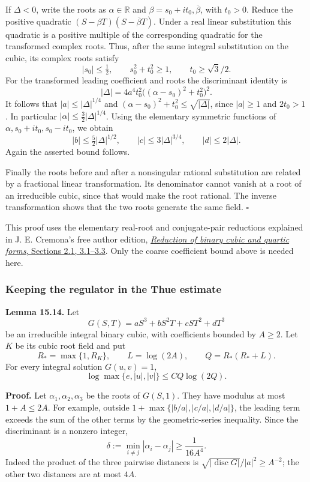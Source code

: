 \documentclass[
  11pt,
  a4paper,
]{article}
\begin{document}
If \(\Delta<0\), write the roots as \(\alpha\in\mathbb R\) and
\(\beta=s_0+it_0,\overline\beta\), with \(t_0>0\). Reduce the positive
quadratic \((S-\beta T)(S-\overline\beta T)\). Under a real linear
substitution this quadratic is a positive multiple of the corresponding
quadratic for the transformed complex roots. Thus, after the same
integral substitution on the cubic, its complex roots satisfy \[
|s_0|\le\tfrac12,\qquad s_0^2+t_0^2\ge1,
\qquad t_0\ge\sqrt3/2.
\] For the transformed leading coefficient and roots the discriminant
identity is \[
|\Delta|=4a^4t_0^2
              \bigl((\alpha-s_0)^2+t_0^2\bigr)^2.
\tag{15.61}
\] It follows that \(|a|\le|\Delta|^{1/4}\) and
\((\alpha-s_0)^2+t_0^2\le\sqrt{|\Delta|}\), since \(|a|\ge1\) and
\(2t_0>1\). In particular \(|\alpha|\le\frac32|\Delta|^{1/4}\). Using
the elementary symmetric functions of \(\alpha,s_0+it_0,s_0-it_0\), we
obtain \[
|b|\le\tfrac52|\Delta|^{1/2},\qquad
|c|\le3|\Delta|^{3/4},\qquad
|d|\le2|\Delta|.
\] Again the asserted bound follows.

Finally the roots before and after a nonsingular rational substitution
are related by a fractional linear transformation. Its denominator
cannot vanish at a root of an irreducible cubic, since that would make
the root rational. The inverse transformation shows that the two roots
generate the same field. \(\square\)

This proof uses the elementary real-root and conjugate-pair reductions
explained in J. E. Cremona's free author edition,
\href{https://johncremona.github.io/papers/r34jcm.pdf}{\emph{Reduction
of binary cubic and quartic forms}, Sections 2.1, 3.1--3.3}. Only the
coarse coefficient bound above is needed here.

\subsubsection{Keeping the regulator in the Thue
estimate}\label{keeping-the-regulator-in-the-thue-estimate}

\textbf{Lemma 15.14.} Let \[
G(S,T)=aS^3+bS^2T+cST^2+dT^3
\] be an irreducible integral binary cubic, with coefficients bounded by
\(A\ge2\). Let \(K\) be its cubic root field and put \[
R_*=\max\{1,R_K\},\qquad L=\log(2A),\qquad
Q=R_*(R_*+L).
\] For every integral solution \(G(u,v)=1\), \[
\log\max\{e,|u|,|v|\}\le C Q\log(2Q).
\tag{15.62}
\]

\textbf{Proof.} Let \(\alpha_1,\alpha_2,\alpha_3\) be the roots of
\(G(S,1)\). They have modulus at most \(1+A\le2A\). For example, outside
\(1+\max\{|b/a|,|c/a|,|d/a|\}\), the leading term exceeds the sum of the
other terms by the geometric-series inequality. Since the discriminant
is a nonzero integer, \[
\delta:=\min_{i\ne j}|\alpha_i-\alpha_j|
       \ge\frac1{16A^4}.
\tag{15.63}
\] Indeed the product of the three pairwise distances is
\(\sqrt{|\operatorname{disc}G|}/|a|^2\ge A^{-2}\); the other two
distances are at most \(4A\).
\end{document}
